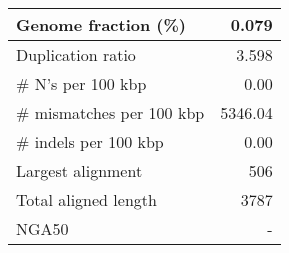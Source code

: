 \documentclass[12pt,a4paper]{article}
\begin{document}
\begin{table}[ht]
\begin{center}
\begin{tabular}{|l*{1}{|r}|}
Genome fraction (\%) & 0.079 \\ \hline
Duplication ratio & 3.598 \\ \hline
\# N's per 100 kbp & 0.00 \\ \hline
\# mismatches per 100 kbp & 5346.04 \\ \hline
\# indels per 100 kbp & 0.00 \\ \hline
Largest alignment & 506 \\ \hline
Total aligned length & 3787 \\ \hline
NGA50 & - \\ \hline
\end{tabular}
\end{center}
\end{table}
\end{document}

